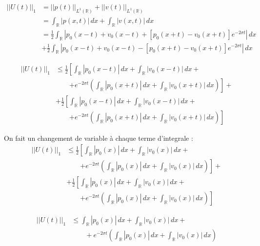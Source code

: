 \documentclass[a4paper,11pt]{article}
\begin{document}
\begin{equation*}
\begin{split}
    ||U(t)||_1 &= ||p(t)||_{L^1(\mathbb{R})} + ||v(t)||_{L^1(\mathbb{R})} \\
    &= \int_{\mathbb{R}}{|p(x,t)|\,dx} + \int_{\mathbb{R}}{|v(x,t)|\,dx} \\
    &= \frac{1}{2} \int_{\mathbb{R}}|p_0(x-t)+v_0(x-t) + [p_0(x+t)-v_0(x+t)] e^{-2\sigma t} | \,dx \\
    & +\frac{1}{2} \int_{\mathbb{R}}|p_0(x-t)+v_0(x-t) - [p_0(x+t)-v_0(x+t)] e^{-2\sigma t} | \,dx
\end{split}
\end{equation*}

\begin{equation*}
\begin{split}
    ||U(t)||_1 & \le \frac{1}{2} \left[\int_{\mathbb{R}}|p_0(x-t)| \,dx + \int_{\mathbb{R}} |v_0(x-t)| \,dx + \right. \\
   & \qquad \left. + e^{-2\sigma t} \left( \int_{\mathbb{R}} |p_0(x+t)| \,dx + \int_{\mathbb{R}} |v_0(x+t)| \,dx \right) \right] + \\
   & + \frac{1}{2} \left[ \int_{\mathbb{R}}|p_0(x-t)| \,dx + \int_{\mathbb{R}} |v_0(x-t)| \,dx + \right. \\
   & \qquad \left. + e^{-2\sigma t} \left( \int_{\mathbb{R}} |p_0(x+t)| \,dx + \int_{\mathbb{R}} |v_0(x+t)| \,dx \right) \right]
\end{split}
\end{equation*}

On fait un changement de variable à chaque terme d'integrale :
\begin{equation*}
\begin{split}
    ||U(t)||_1 & \le \frac{1}{2} \left[\int_{\mathbb{R}}|p_0(x)| \,dx + \int_{\mathbb{R}} |v_0(x)| \,dx + \right. \\
   & \qquad \left. + e^{-2\sigma t} \left(\int_{\mathbb{R}} |p_0(x)| \,dx + \int_{\mathbb{R}} |v_0(x)| \,dx \right) \right] + \\
   & + \frac{1}{2} \left[ \int_{\mathbb{R}}|p_0(x)| \,dx + \int_{\mathbb{R}} |v_0(x)| \,dx + \right. \\
   & \qquad \left. + e^{-2\sigma t} \left(\int_{\mathbb{R}} |p_0(x)| \,dx + \int_{\mathbb{R}} |v_0(x)| \,dx \right) \right]
\end{split}
\end{equation*}

\begin{equation*}
\begin{split}
    ||U(t)||_1 & \le \int_{\mathbb{R}}|p_0(x)| \,dx + \int_{\mathbb{R}} |v_0(x)| \,dx + \\
   & \qquad + e^{-2\sigma t} \left( \int_{\mathbb{R}} |p_0(x)| \,dx + \int_{\mathbb{R}} |v_0(x)| \,dx \right)
\end{split}
\end{equation*}
\end{document}
